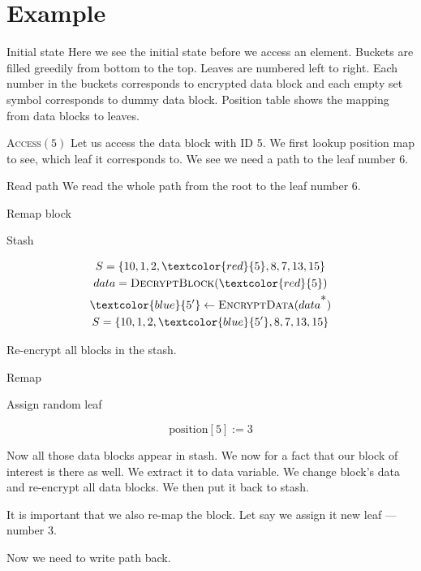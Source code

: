


\section{Example}

	\exampleFrame%
		{Initial state}
		{}
		{}
		{}
		{
			Here we see the initial state before we access an element.
			Buckets are filled greedily from bottom to the top.
			Leaves are numbered left to right.
			Each number in the buckets corresponds to encrypted data block and each empty set symbol corresponds to dummy data block.
			Position table shows the mapping from data blocks to leaves.
		}

	\exampleFrame%
		{\textsc{Access}$(5)$}
		{\selectedtrue}
		{}
		{}
		{
			Let us access the data block with ID 5.
			We first lookup position map to see, which leaf it corresponds to.
			We see we need a path to the leaf number 6.
		}
	
	\exampleFrame%
		{Read path}
		{
			\selectedtrue%
			\pathreadtrue%
		}
		{}
		{}
		{
			We read the whole path from the root to the leaf number 6.
		}

	\exampleFrame%
		{Remap block}
		{}
		{
			\begin{block}{Stash}
				
				\begin{gather*}
					S = \{ 10, 1, 2, \textcolor{red}{5}, 8, 7, 13, 15 \} \\
					data = \textsc{DecryptBlock}(\textcolor{red}{5}) \\
					\textcolor{blue}{5^\prime} \gets \textsc{EncryptData}(data^{\mbox{*}}) \\
					S = \{ 10, 1, 2, \textcolor{blue}{5^\prime}, 8, 7, 13, 15 \}
				\end{gather*}

				Re-encrypt all blocks in the stash.
	
			\end{block}
		}
		{
			\begin{block}{Remap}
				
				Assign random leaf
	
				\[
					\text{position}[5] := 3
				\]
	
			\end{block}
		}
		{
			Now all those data blocks appear in stash.
			We now for a fact that our block of interest is there as well.
			We extract it to data variable.
			We change block's data and re-encrypt all data blocks.
			We then put it back to stash.

			It is important that we also re-map the block.
			Let say we assign it new leaf --- number 3.

			Now we need to write path back.
		}

